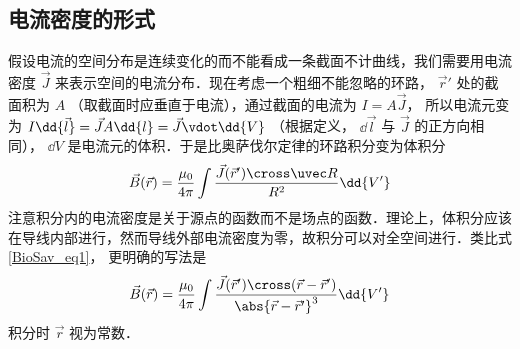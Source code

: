 \subsection{电流密度的形式}
假设电流的空间分布是连续变化的而不能看成一条截面不计曲线，我们需要用电流密度 $\vec J$ 来表示空间的电流分布．现在考虑一个粗细不能忽略的环路， $\vec r'$ 处的截面积为 $A$ （取截面时应垂直于电流），通过截面的电流为 $I = A\vec J$， 所以电流元变为 $I \dd{\vec l} = \vec JA \dd{l} = \vec J \vdot \dd{V}$ （根据定义， $\dd{\vec l}$ 与 $\vec J$ 的正方向相同）， $\dd{V}$ 是电流元的体积．于是比奥萨伐尔定律的环路积分变为体积分
\begin{equation}
\vec B(\vec r) = \frac{\mu_0}{4\pi} \int \frac{\vec J(\vec r') \cross \uvec R}{R^2}\dd{V'}
\end{equation}
注意积分内的电流密度是关于源点的函数而不是场点的函数．理论上，体积分应该在导线内部进行，然而导线外部电流密度为零，故积分可以对全空间进行．类比式\autoref{BioSav_eq1}， 更明确的写法是
\begin{equation}
\vec B(\vec r) = \frac{\mu_0}{4\pi} \int \frac{\vec J(\vec r') \cross (\vec r - \vec r')}{\abs{\vec r - \vec r'}^3} \dd{V'}
\end{equation}
积分时 $\vec r$ 视为常数．

